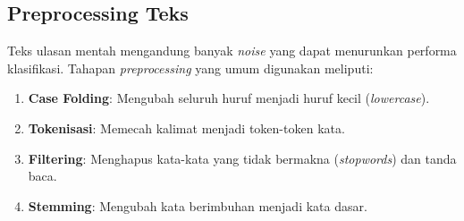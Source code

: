 \subsection{Preprocessing Teks}

Teks ulasan mentah mengandung banyak \emph{noise} yang dapat menurunkan performa klasifikasi. Tahapan \emph{preprocessing} yang umum digunakan meliputi:

\begin{enumerate}
  \item \textbf{Case Folding}: Mengubah seluruh huruf menjadi huruf kecil (\emph{lowercase}).
  \item \textbf{Tokenisasi}: Memecah kalimat menjadi token-token kata.
  \item \textbf{Filtering}: Menghapus kata-kata yang tidak bermakna (\emph{stopwords}) dan tanda baca.
  \item \textbf{Stemming}: Mengubah kata berimbuhan menjadi kata dasar.
\end{enumerate}
